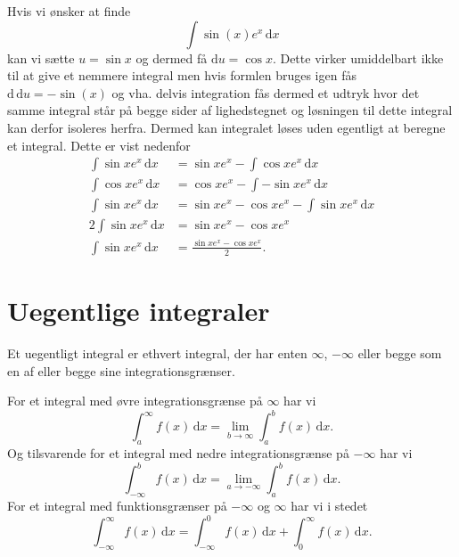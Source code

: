 \begin{eks} 
  Hvis vi ønsker at finde
  \[ 
  \int \sin(x) e^{x} \, \mathrm{d}x 
  \]
  kan vi sætte $u = \sin x$ og dermed få $\mathrm{d}u = \cos x$. Dette virker umiddelbart ikke til at give et nemmere integral men hvis formlen bruges igen fås $\mathrm{d\,d}u = -\sin(x)$ og vha. delvis integration fås dermed et udtryk hvor det samme integral står på begge sider af lighedstegnet og løsningen til dette integral kan derfor isoleres herfra. Dermed kan integralet løses uden egentligt at beregne et integral. Dette er vist nedenfor
  \begin{align*}
    \int \sin x e^{x}\, \mathrm{d}x &= \sin x e^{x} - \int \cos x e^{x} \, \mathrm{d}x \\
    \int \cos x e^{x} \, \mathrm{d}x &= \cos x e^{x} - \int - \sin x e^{x} \, \mathrm{d}x \\
    \int \sin x e^{x} \, \mathrm{d}x &= \sin x e^{x} - \cos x e^{x} - \int \sin x e^{x} \, \mathrm{d}x  \\
    2 \int \sin xe^{x} \, \mathrm{d}x &= \sin x e^{x} - \cos x e^{x} \\
    \int \sin xe^{x} \, \mathrm{d}x &= \frac{\sin x e^{x} - \cos x e^{x}}{2}
  .\end{align*}
\end{eks}

\section{Uegentlige integraler}
Et uegentligt integral er ethvert integral, der har enten $\infty$, $-\infty$ eller begge som en af eller begge sine integrationsgrænser.
\begin{sæt} 
  For et integral med øvre integrationsgrænse på $\infty$ har vi
  \[ 
  \int_{a}^{\infty} f(x) \, \mathrm{d}x = \lim_{b \to \infty } \int_{a}^{b} f(x) \, \mathrm{d}x
  .\]
  Og tilsvarende for et integral med nedre integrationsgrænse på $-\infty$ har vi
  \[ 
  \int_{-\infty}^{b} f(x) \, \mathrm{d}x = \lim_{a\to -\infty} \int_{a}^{b} f(x) \, \mathrm{d}x 
  .\]
  For et integral med funktionsgrænser på $-\infty$ og $\infty$ har vi i stedet
  \[ 
  \int_{-\infty}^{\infty} f(x) \, \mathrm{d}x = \int_{-\infty}^{0} f(x) \, \mathrm{d}x + \int_{0}^{\infty} f(x) \, \mathrm{d}x 
  .\]
\end{sæt}

